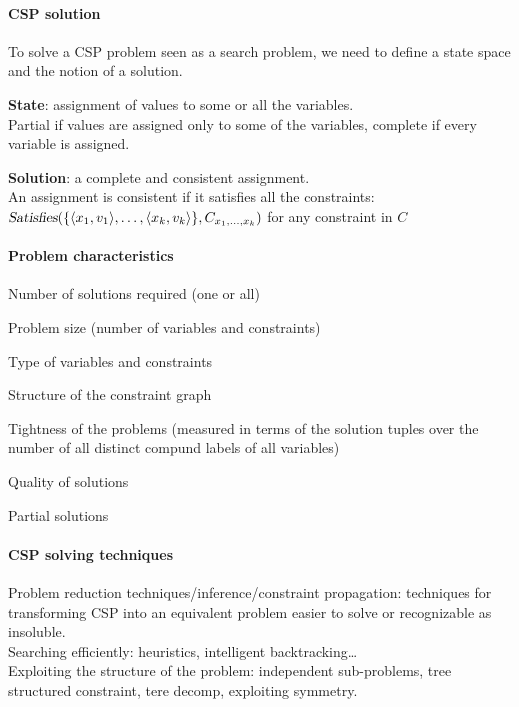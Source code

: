 \documentclass[10pt]{report}
\begin{document}
\paragraph{CSP solution} To solve a CSP problem seen as a search problem, we need to define a state space and the notion of a solution.
\begin{list}{}{}
	\item \textbf{State}: assignment of values to some or all the variables.\\
	Partial if values are assigned only to some of the variables, complete if every variable is assigned.
	\item \textbf{Solution}: a complete and consistent assignment.\\
	An assignment is consistent if it satisfies all the constraints: $\textsl{Satisfies}(\{\langle x_1,v_1\rangle, \ldots, \langle x_k, v_k\rangle\}, C_{x_1,\ldots, x_k})$ for any constraint in $C$
\end{list}
\paragraph{Problem characteristics} \begin{list}{}{}
	\item Number of solutions required (one or all)
	\item Problem size (number of variables and constraints)
	\item Type of variables and constraints
	\item Structure of the constraint graph
	\item Tightness of the problems (measured in terms of the solution tuples over the number of all distinct compund labels of all variables)
	\item Quality of solutions
	\item Partial solutions
\end{list}
\paragraph{CSP solving techniques} Problem reduction techniques/inference/constraint propagation: techniques for transforming CSP into an equivalent problem easier to solve or recognizable as insoluble.\\
Searching efficiently: heuristics, intelligent backtracking\ldots\\
Exploiting the structure of the problem: independent sub-problems, tree structured constraint, tere decomp, exploiting symmetry.
\end{document}
